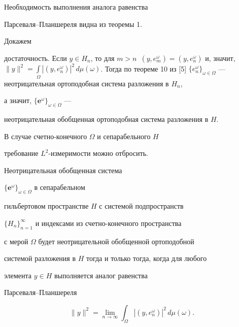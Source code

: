 \begin{pf}


Необходимость выполнения аналога равенства


Парсеваля--Планшереля видна из теоремы 1.





Докажем


достаточность. Если $y\in H_n$, то для $m>n$\ $(y,e^\omega_m)=(y,


e^\omega_n)$ и, значит, $\|y\|^2=\int\limits_\Omega|(y,e^\omega_n)|^2\,d\mu


(\omega)$. Тогда по теореме 10 из [5] $\{e^\omega_n\}_{\omega\in


\Omega}$ --- неотрицательная ортоподобная система разложения в $H_n$,


а значит, $\{\boldsymbol e^\omega\}_{\omega\in\Omega}$ ---


неотрицательная обобщенная ортоподобная система разложения в $H$.


\end{pf}





В случае счетно-конечного $\Omega$ и сепарабельного $H$


требование $L^2$-измеримости можно отбросить.





\begin{thm}\hspace{-1.8mm}{\bf.}


Неотрицательная обобщенная система


$\{\boldsymbol e^\omega\}_{\omega\in\Omega}$ в сепарабельном


гильбертовом пространстве $H$ с системой подпространств


$\{H_n\}_{n=1}^\infty$ и индексами из счетно-конечного пространства


с мерой $\Omega$ будет неотрицательной обобщенной ортоподобной


системой разложения в $H$ тогда и только тогда, когда для любого


элемента $y\in H$ выполняется аналог равенства


Парсеваля--Планшереля


$$


\|y\|^2=\lim_{n\to\infty}\int_\Omega|(y,e^\omega_n)|^2\,d\mu(\omega).


$$


\end{thm}





